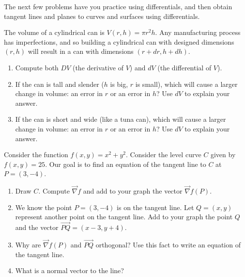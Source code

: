 The next few problems have you practice using differentials, and then obtain tangent lines and planes to curves and surfaces 	using differentials.

\begin{problem}
The volume of a cylindrical can is $V(r,h)=\pi r^2 h$. Any manufacturing process has imperfections, and so building a cylindrical can with designed dimensions $(r,h)$ will result in a can with dimensions $(r+dr,h+dh)$. 
\begin{enumerate}
 \item Compute both $DV$ (the derivative of $V$) and $dV$ (the differential of $V$).
 \item If the can is tall and slender ($h$ is big, $r$ is small), which will cause a larger change in volume: an error in $r$ or an error in $h$? Use $dV$ to explain your answer.
 \item If the can is short and wide (like a tuna can), which will cause a larger change in volume: an error in $r$ or an error in $h$? Use $dV$ to explain your answer.
\end{enumerate}
\end{problem}

\begin{problem}
 Consider the function $f(x,y)=x^2+y^2$.  Consider the level curve $C$ given by $f(x,y)=25$. Our goal is to find an equation of the tangent line to $C$ at $P=(3,-4)$.
 \begin{enumerate}
  \item Draw $C$. Compute $\vec \nabla f$ and add to your graph the vector $\vec \nabla f(P)$. 
  \item We know the point $P=(3,-4)$ is on the tangent line. Let $Q=(x,y)$ represent another point on the tangent line. Add to your graph the point $Q$ and the vector $\vec {PQ} = (x-3,y+4)$.
  \item Why are  $\vec \nabla f(P)$ and $\vec{PQ}$ orthogonal? Use this fact to write an equation of the tangent line.
  \item What is a normal vector to the line?
 \end{enumerate}
\end{problem}

